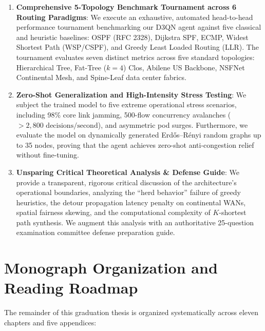 \begin{enumerate}[label=\textbf{\arabic*.}]
    \item \textbf{Comprehensive 5-Topology Benchmark Tournament across 6 Routing Paradigms}:
    We execute an exhaustive, automated head-to-head performance tournament benchmarking our D3QN agent against five classical and heuristic baselines: OSPF (RFC 2328), Dijkstra SPF, ECMP, Widest Shortest Path (WSP/CSPF), and Greedy Least Loaded Routing (LLR). The tournament evaluates seven distinct metrics across five standard topologies: Hierarchical Tree, Fat-Tree ($k=4$) Clos, Abilene US Backbone, NSFNet Continental Mesh, and Spine-Leaf data center fabrics.
    
    \item \textbf{Zero-Shot Generalization and High-Intensity Stress Testing}:
    We subject the trained model to five extreme operational stress scenarios, including 98\% core link jamming, 500-flow concurrency avalanches ($> 2,800\text{ decisions/second}$), and asymmetric pod surges. Furthermore, we evaluate the model on dynamically generated Erd\H{o}s--R\'enyi random graphs up to 35 nodes, proving that the agent achieves zero-shot anti-congestion relief without fine-tuning.
    
    \item \textbf{Unsparing Critical Theoretical Analysis \& Defense Guide}:
    We provide a transparent, rigorous critical discussion of the architecture's operational boundaries, analyzing the ``herd behavior'' failure of greedy heuristics, the detour propagation latency penalty on continental WANs, spatial fairness skewing, and the computational complexity of $K$-shortest path synthesis. We augment this analysis with an authoritative 25-question examination committee defense preparation guide.
\end{enumerate}

\section{Monograph Organization and Reading Roadmap}
The remainder of this graduation thesis is organized systematically across eleven chapters and five appendices:

